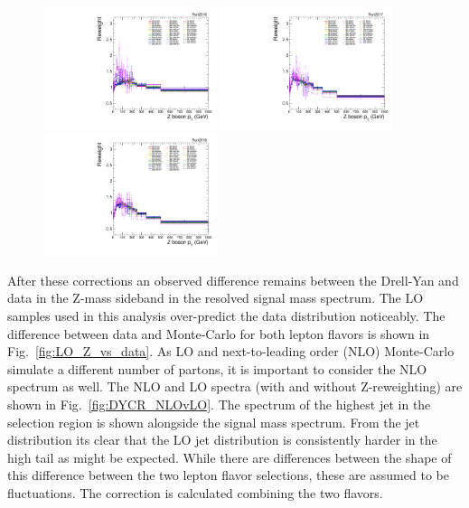 \begin{figure}[htbp]
  \centering

  \includegraphics[width=0.45\textwidth]{figures/2016/Reweights_2016.pdf}
  \hspace{0.01\textwidth}

  \includegraphics[width=0.45\textwidth]{figures/2017/Reweights_2017.pdf}
  \hspace{0.01\textwidth}

  \includegraphics[width=0.45\textwidth]{figures/2018/Reweights_2018.pdf}

  \label{fig:BkgdZptReweight}
\end{figure}

After these corrections an observed difference remains between the Drell-Yan and data in the Z-mass sideband in the resolved signal mass spectrum. The LO samples used in this analysis over-predict the data distribution noticeably. The difference between data and Monte-Carlo for both lepton flavors is shown in Fig.~\ref{fig:LO_Z_vs_data}. As LO and next-to-leading order (NLO) Monte-Carlo simulate a different number of partons, it is important to consider the NLO spectrum as well. The NLO and LO spectra (with and without Z-\pt reweighting) are shown in Fig.~\ref{fig:DYCR_NLOvLO}. The spectrum of the highest \pt jet in the selection region is shown alongside the signal mass spectrum. From the jet \pt distribution its clear that the LO jet distribution is consistently harder in the high \pt tail as might be expected. While there are differences between the shape of this difference between the two lepton flavor selections, these are assumed to be fluctuations. The correction is calculated combining the two flavors.


